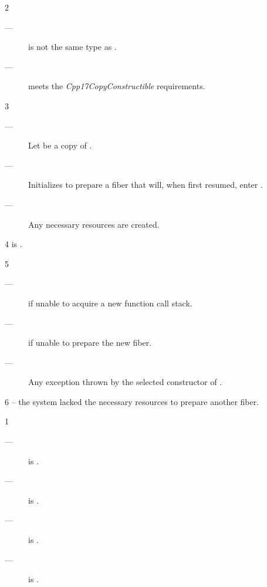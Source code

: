 2 \constraints
\begin{description}
    \item[---]  is not the same type as \fiber.
    \item[---]  meets the \emph{Cpp17CopyConstructible} requirements.
\end{description}

3 \effects
\begin{description}
    \item[---] Let  be a copy of .
    \item[---] Initializes  to prepare a fiber that will, when
               first resumed, enter .
    \item[---] Any necessary resources are created. 
\end{description}

4 \postcond
\emptyfn is \false.

5 \except
\begin{description}
    \item[---]  if unable to acquire a new function call stack.
    \item[---]  if unable to prepare the new fiber.
    \item[---] Any exception thrown by the selected constructor of .
\end{description}

6 \errors
{} -- the system lacked the necessary resources to prepare another fiber.


1 \mandates
\begin{description}
    \item[---]  is \true.
    \item[---]  is \true.
    \item[---]  is \true.
    \item[---]  is \true.
\end{description}

